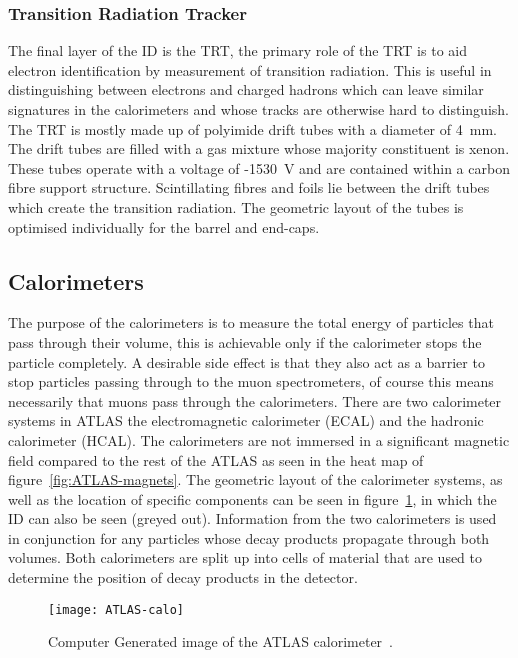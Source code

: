 \subsubsection{Transition Radiation Tracker}

The final layer of the ID is the TRT, the primary role of the TRT is to aid
electron identification by measurement of transition radiation. This is useful
in distinguishing between electrons and charged hadrons which can leave similar
signatures in the calorimeters and whose tracks are otherwise hard to
distinguish. The TRT is mostly made up of polyimide drift tubes with a diameter
of 4~mm. The drift tubes are filled with a gas mixture whose majority
constituent is xenon. These tubes operate with a voltage of -1530~V and are
contained within a carbon fibre support structure. Scintillating fibres and
foils lie between the drift tubes which create the transition radiation.  The
geometric layout of the tubes is optimised individually for the barrel and
end-caps.

\subsection{Calorimeters}%
\label{sec:calo}

The purpose of the calorimeters is to measure the total energy of particles that
pass through their volume, this is achievable only if the calorimeter stops the
particle completely. A desirable side effect is that they also act as a barrier
to stop particles passing through to the muon spectrometers, of course this
means necessarily that muons pass through the calorimeters. There are two
calorimeter systems in ATLAS the electromagnetic calorimeter (ECAL) and the
hadronic calorimeter (HCAL). The calorimeters are not immersed in a significant
magnetic field compared to the rest of the ATLAS as seen in the heat map of
figure~\ref{fig:ATLAS-magnets}. The geometric layout of the calorimeter systems,
as well as the location of specific components can be seen in
figure~\ref{fig:ATLAS-calo}, in which the ID can also be seen (greyed out).
Information from the two calorimeters is used in conjunction for any particles
whose decay products propagate through both volumes. Both calorimeters are split
up into cells of material that are used to determine the position of decay
products in the detector.
\begin{figure}[ht] \centering \texttt{[image: ATLAS-calo]}
  \caption[ATLAS Calorimeter]{Computer Generated image of the ATLAS
calorimeter~\cite{ATLAS-calo-fig}.}%
  \label{fig:ATLAS-calo}
\end{figure}

